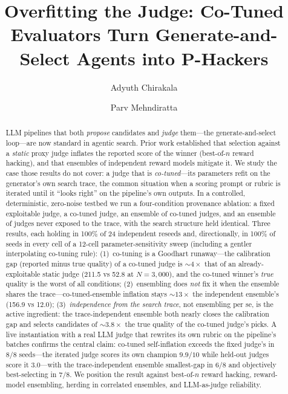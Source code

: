 \documentclass[sigconf]{acmart}
\begin{document}
\title{Overfitting the Judge: Co-Tuned Evaluators Turn Generate-and-Select Agents into P-Hackers}

\author{Adyuth Chirakala}
\author{Parv Mehndiratta}

\begin{abstract}
LLM pipelines that both \emph{propose} candidates and \emph{judge} them---the generate-and-select loop---are now standard in agentic search. Prior work established that selection against a \emph{static} proxy judge inflates the reported score of the winner (best-of-$n$ reward hacking), and that ensembles of independent reward models mitigate it. We study the case those results do not cover: a judge that is \emph{co-tuned}---its parameters refit on the generator's own search trace, the common situation when a scoring prompt or rubric is iterated until it ``looks right'' on the pipeline's own outputs. In a controlled, deterministic, zero-noise testbed we run a four-condition provenance ablation: a fixed exploitable judge, a co-tuned judge, an ensemble of co-tuned judges, and an ensemble of judges never exposed to the trace, with the search structure held identical. Three results, each holding in 100\% of 24 independent reseeds and, directionally, in 100\% of seeds in every cell of a 12-cell parameter-sensitivity sweep (including a gentler interpolating co-tuning rule): (1)~co-tuning is a Goodhart runaway---the calibration gap (reported minus true quality) of a co-tuned judge is ${\sim}4\times$ that of an already-exploitable static judge (211.5 vs 52.8 at $N{=}3{,}000$), and the co-tuned winner's \emph{true} quality is the worst of all conditions; (2)~ensembling does \emph{not} fix it when the ensemble shares the trace---co-tuned-ensemble inflation stays ${\sim}13\times$ the independent ensemble's (156.9 vs 12.0); (3)~\emph{independence from the search trace}, not ensembling per se, is the active ingredient: the trace-independent ensemble both nearly closes the calibration gap and selects candidates of ${\sim}3.8\times$ the true quality of the co-tuned judge's picks. A live instantiation with a real LLM judge that rewrites its own rubric on the pipeline's batches confirms the central claim: co-tuned self-inflation exceeds the fixed judge's in 8/8 seeds---the iterated judge scores its own champion $9.9/10$ while held-out judges score it $3.0$---with the trace-independent ensemble smallest-gap in 6/8 and objectively best-selecting in 7/8. We position the result against best-of-$n$ reward hacking, reward-model ensembling, herding in correlated ensembles, and LLM-as-judge reliability.
\end{abstract}
\end{document}
